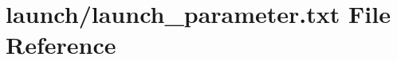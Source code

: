 \hypertarget{launch__parameter_8txt}{\section{launch/launch\-\_\-parameter.txt \-File \-Reference}
\label{launch__parameter_8txt}
}

